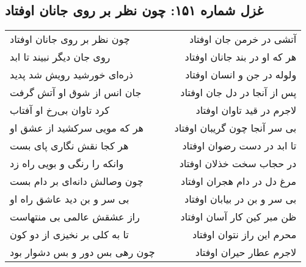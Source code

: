 \begin{center}
\section*{غزل شماره ۱۵۱: چون نظر بر روی جانان اوفتاد}
\label{sec:151}
\begin{longtable}{l p{0.5cm} r}
چون نظر بر روی جانان اوفتاد
&&
آتشی در خرمن جان اوفتاد
\\
روی جان دیگر نبیند تا ابد
&&
هر که او در بند جانان اوفتاد
\\
ذره‌ای خورشید رویش شد پدید
&&
ولوله در جن و انسان اوفتاد
\\
جان انس از شوق او آتش گرفت
&&
پس از آنجا در دل جان اوفتاد
\\
کرد تاوان بی‌رخ او آفتاب
&&
لاجرم در قید تاوان اوفتاد
\\
هر که مویی سرکشید از عشق او
&&
بی سر آنجا چون گریبان اوفتاد
\\
هر کجا نقش نگاری پای بست
&&
تا ابد در دست رضوان اوفتاد
\\
وانکه را رنگی و بویی راه زد
&&
در حجاب سخت خذلان اوفتاد
\\
چون وصالش دانه‌ای بر دام بست
&&
مرغ دل در دام هجران اوفتاد
\\
بی سر و بن دید عاشق راه او
&&
بی سر و بن در بیابان اوفتاد
\\
راز عشقش عالمی بی منتهاست
&&
ظن مبر کین کار آسان اوفتاد
\\
تا به کلی بر نخیزی از دو کون
&&
محرم این راز نتوان اوفتاد
\\
چون رهی بس دور و بس دشوار بود
&&
لاجرم عطار حیران اوفتاد
\\
\end{longtable}
\end{center}
